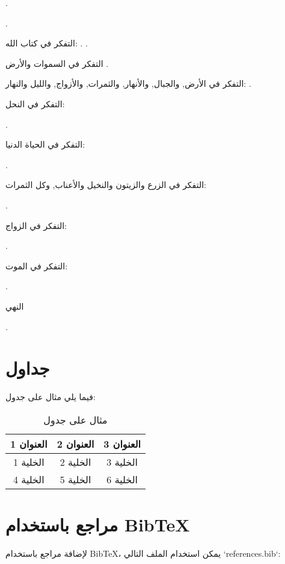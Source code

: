 \quranayah*[3][190-191]{\footnotesize \surahname*[3]}.

\quranayah*[45][3-5]{\footnotesize \surahname*[45]}.

التفكر في كتاب الله:
\quranayah*[59][21]{\footnotesize \surahname*[59]}.
\quranayah*[16][44]{\footnotesize \surahname*[16]}.

التفكر في السموات والأرض
\quranayah*[45][13]{\footnotesize \surahname*[45]}.

التفكر في الأرض, والجبال, والأنهار, والثمرات, والأزواج, والليل والنهار:
\quranayah*[13][3]{\footnotesize \surahname*[13]}.

التفكر في النحل:

\quranayah*[16][69]{\footnotesize \surahname*[16]}.

التفكر في الحياة الدنيا:

\quranayah*[10][24]{\footnotesize \surahname*[10]}.

التفكر في الزرع والزيتون والنخيل والأعناب, وكل الثمرات:

\quranayah*[16][11]{\footnotesize \surahname*[16]}.

التفكر في الزواج:

\quranayah*[30][21]{\footnotesize \surahname*[30]}.

التفكر في الموت:

\quranayah*[39][42]{\footnotesize \surahname*[39]}.

النهي

\quranayah*[22][46]{\footnotesize \surahname*[22]}.


\section{جداول}
فيما يلي مثال على جدول:

\begin{table}[h]
  \centering
  \begin{tabular}{|c|c|c|}
    \hline
    العنوان 1 & العنوان 2 & العنوان 3 \\
    \hline
    الخلية 1  & الخلية 2  & الخلية 3  \\
    \hline
    الخلية 4  & الخلية 5  & الخلية 6  \\
    \hline
  \end{tabular}
  \caption{مثال على جدول}
\end{table}

\newpage

\section{مراجع باستخدام BibTeX}
لإضافة مراجع باستخدام BibTeX، يمكن استخدام الملف التالي `references.bib`:

